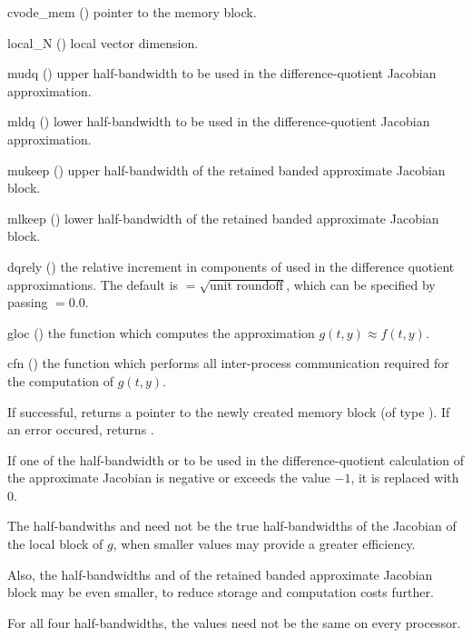 {
  \begin{args}
  \item[cvode\_mem] ()
    pointer to the {\cvodes} memory block.
  \item[local\_N] ()
    local vector dimension.
  \item[mudq] ()
    upper half-bandwidth to be used in the difference-quotient Jacobian approximation.
  \item[mldq] ()
    lower half-bandwidth to be used in the difference-quotient Jacobian approximation.
  \item[mukeep] ()
    upper half-bandwidth of the retained banded approximate Jacobian block.
  \item[mlkeep] ()
    lower half-bandwidth of the retained banded approximate Jacobian block.
  \item[dqrely] ()
    the relative increment in components of  used in the difference quotient
    approximations.  The default is $ = \sqrt{\text{unit roundoff}}$, which
    can be specified by passing $ = 0.0$.
  \item[gloc] ()
    the {\C} function which computes the approximation $g(t,y) \approx f(t,y)$. 
  \item[cfn] ()
    the {\C} function which performs all inter-process communication required for
    the computation of $g(t,y)$.
  \end{args}
}
{
  If successful,  returns a pointer to the newly created 
  {\cvbbdpre} memory block (of type ).
  If an error occured,  returns .
}
{
  If one of the half-bandwidth  or  to be used in the 
  difference-quotient calculation of the approximate Jacobian is negative or 
  exceeds the value $-1$, it is replaced with 0.

  The half-bandwiths  and  need not be the true 
  half-bandwidths of the Jacobian of the local block of $g$,    
  when smaller values may provide a greater efficiency.       

  Also, the half-bandwidths  and  of the retained 
  banded approximate Jacobian block may be even smaller,      
  to reduce storage and computation costs further.            

  For all four half-bandwidths, the values need not be the    
  same on every processor.
}

